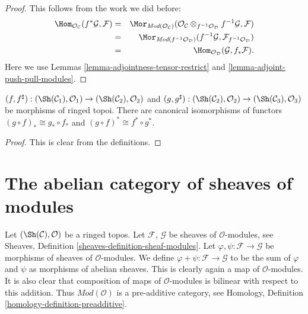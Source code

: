 \begin{proof}
This follows from the work we did before:
\begin{eqnarray*}
\Hom_{\mathcal{O}_\mathcal{C}}(f^*\mathcal{G}, \mathcal{F})
& = &
\Mor_{\textit{Mod}(\mathcal{O}_\mathcal{C})}(
\mathcal{O}_\mathcal{C}
\otimes_{f^{-1}\mathcal{O}_\mathcal{D}} f^{-1}\mathcal{G},
\mathcal{F}) \\
& = &
\Mor_{\textit{Mod}(f^{-1}\mathcal{O}_\mathcal{D})}(
f^{-1}\mathcal{G}, \mathcal{F}_{f^{-1}\mathcal{O}_\mathcal{D}}) \\
& = &
\Hom_{\mathcal{O}_\mathcal{D}}(\mathcal{G}, f_*\mathcal{F}).
\end{eqnarray*}
Here we use Lemmas \ref{lemma-adjointness-tensor-restrict}
and \ref{lemma-adjoint-push-pull-modules}.
\end{proof}

\begin{lemma}
\label{lemma-push-pull-composition-modules}
$(f, f^\sharp) :
(\Sh(\mathcal{C}_1), \mathcal{O}_1)
\to (\Sh(\mathcal{C}_2), \mathcal{O}_2)$ and
$(g, g^\sharp) :
(\Sh(\mathcal{C}_2), \mathcal{O}_2) \to
(\Sh(\mathcal{C}_3), \mathcal{O}_3)$
be morphisms of ringed topoi.
There are canonical isomorphisms of functors
$(g \circ f)_* \cong g_* \circ f_*$ and
$(g \circ f)^* \cong f^* \circ g^*$.
\end{lemma}

\begin{proof}
This is clear from the definitions.
\end{proof}





\section{The abelian category of sheaves of modules}
\label{section-kernels}

\noindent
Let $(\Sh(\mathcal{C}), \mathcal{O})$ be a ringed topos.
Let $\mathcal{F}$, $\mathcal{G}$ be sheaves of $\mathcal{O}$-modules, see
Sheaves, Definition \ref{sheaves-definition-sheaf-modules}.
Let $\varphi, \psi : \mathcal{F} \to \mathcal{G}$
be morphisms of sheaves of $\mathcal{O}$-modules.
We define $\varphi + \psi : \mathcal{F} \to \mathcal{G}$
to be the sum of $\varphi$ and $\psi$ as morphisms of abelian sheaves.
This is clearly again a map of $\mathcal{O}$-modules.
It is also clear that composition of maps of
$\mathcal{O}$-modules is bilinear with respect to this
addition. Thus $\textit{Mod}(\mathcal{O})$ is a pre-additive
category, see Homology, Definition \ref{homology-definition-preadditive}.

